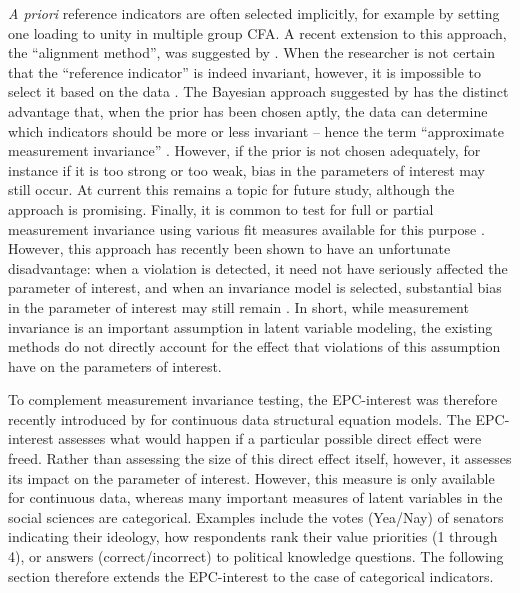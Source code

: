\emph{A priori} reference indicators are often selected implicitly, for example by setting one loading to unity in multiple group CFA. A recent extension to this approach, the ``alignment method'', was suggested by \citet{muthen2014alignment}. When the researcher is not certain that the ``reference indicator'' is indeed invariant, however, it is impossible to select it based on the data \citep{hancock2009tenuousness}. The Bayesian approach suggested by \citet{muthen2012bayesian} has the distinct advantage that, when the prior has been chosen aptly, the data can determine which indicators should be more or less invariant -- hence the term ``approximate measurement invariance'' \citep[see also][]{schoot2013facing}. However, if the prior is not chosen adequately, for instance if it is too strong or too weak, bias in the parameters of interest may still occur. At current this remains a topic for future study, although the approach is promising. Finally, it is common to test for full or partial measurement invariance using various fit measures available for this purpose \citep{byrne1989testing,hu1998fit,cheung2002evaluating,chen2007sensitivity,saris2009testing}. However, this approach has recently been shown to have an unfortunate disadvantage: when a violation is detected, it need not have seriously affected the parameter of interest, and when an invariance model is selected, substantial bias in the parameter of interest may still remain \citep{Oberski:WP:EPC-interest}. In short, while measurement invariance is an important assumption in latent variable modeling, the existing methods do not directly account for the effect that violations of this assumption have on the parameters of interest.

To complement measurement invariance testing, the 
 EPC-interest was therefore recently introduced by \citet{Oberski:WP:EPC-interest} for continuous data structural equation models. The EPC-interest assesses what would happen if a particular possible direct effect were freed. Rather than assessing the size of this direct effect itself, however, it assesses its impact on the parameter of interest. However, this measure is only available for continuous data, whereas many important measures of latent variables in the social sciences are categorical. Examples include the votes (Yea/Nay) of senators indicating their ideology, how respondents rank their value priorities (1 through 4), or answers (correct/incorrect) to political knowledge questions. The following section therefore extends the EPC-interest to the case of categorical indicators.


